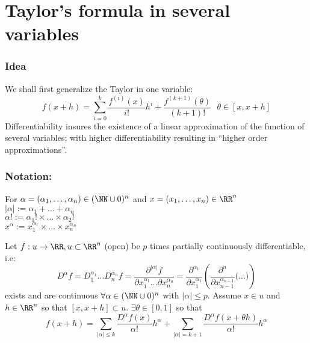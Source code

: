 \section{Taylor's formula in several variables}
\subsubsection*{Idea}
We shall first generalize the Taylor in one variable: 
\begin{equation*}
  f(x+h) = \sum_{i=0}^k\frac{f^{(i)}(x)}{i!}h^i + \frac{f^{(k+1)}(\theta)}{(k+1)!} \:\:\: \theta \in [x, x+h]
\end{equation*}
Differentiability insures the existence of a linear approximation of the function of several variables; with higher differentiability resulting in ``higher order approximations''.

\subsubsection*{Notation:}
For $\alpha = (\alpha_1, \dots, \alpha_n) \in (\NN \cup {0})^n$ and $x = (x_1, \dots, x_n) \in \RR^n$ \\
$|\alpha| := \alpha_1 + \dots + \alpha_n$ \\
$\alpha ! := \alpha_1! \times \dots \times \alpha_2!$ \\
$x^\alpha := x_1^{\alpha_1} \times \dots \times x_n^{\alpha_n}$

\begin{thm}
Let $f: u \to \RR, u \subset \RR^n$ (open) be $p$ times partially continuously differentiable, i.e:
\begin{equation*}
  D^\alpha f = D_1^{\alpha_1} \dots D_n^{\alpha_n}f = \frac{\partial^{|\alpha|}f}{\partial x_1^{\alpha_1} \dots \partial x_n^{\alpha_n}} = \frac{\partial^{\alpha_1}}{\partial x_1^{\alpha_1}}\left( \frac{\partial^n}{\partial x^{\alpha_{n-1}}_{n-1}} \bigg( \dots \bigg) \right)
\end{equation*}
exists and are continuous $\forall \alpha \in (\NN \cup {0})^n$ with $|\alpha| \leq p$. Assume $x\in u$ and $h \in \RR^n$ so that $[x, x+h] \subset u$. $\exists \theta \in [0, 1]$ so that
\begin{equation*}
  f(x+h) = \sum_{|\alpha| \leq k}\frac{D^\alpha f(x)}{\alpha !}h^\alpha + \sum_{|\alpha| = k+1}\frac{D^\alpha f(x+\theta h)}{\alpha !} h^\alpha
\end{equation*}
\end{thm}

